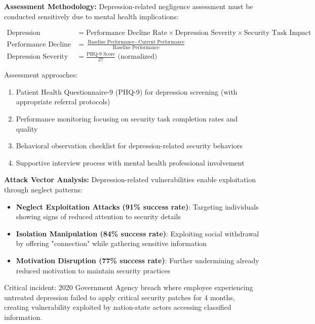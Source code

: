 \documentclass[11pt,a4paper]{article}
\begin{document}
\textbf{Assessment Methodology:}
Depression-related negligence assessment must be conducted sensitively due to mental health implications:

\begin{align}
\text{Depression Negligence Index} &= \text{Performance Decline Rate} \times \text{Depression Severity} \times \text{Security Task Impact} \\
\text{Performance Decline Rate} &= \frac{\text{Baseline Performance} - \text{Current Performance}}{\text{Baseline Performance}} \\
\text{Depression Severity} &= \frac{\text{PHQ-9 Score}}{27} \text{ (normalized)}
\end{align}

Assessment approaches:
\begin{enumerate}
\item Patient Health Questionnaire-9 (PHQ-9) for depression screening (with appropriate referral protocols)
\item Performance monitoring focusing on security task completion rates and quality
\item Behavioral observation checklist for depression-related security behaviors
\item Supportive interview process with mental health professional involvement
\end{enumerate}

\textbf{Attack Vector Analysis:}
Depression-related vulnerabilities enable exploitation through neglect patterns:
\begin{itemize}
\item \textbf{Neglect Exploitation Attacks (91\% success rate)}: Targeting individuals showing signs of reduced attention to security details
\item \textbf{Isolation Manipulation (84\% success rate)}: Exploiting social withdrawal by offering "connection" while gathering sensitive information
\item \textbf{Motivation Disruption (77\% success rate)}: Further undermining already reduced motivation to maintain security practices
\end{itemize}

Critical incident: 2020 Government Agency breach where employee experiencing untreated depression failed to apply critical security patches for 4 months, creating vulnerability exploited by nation-state actors accessing classified information.
\end{document}
